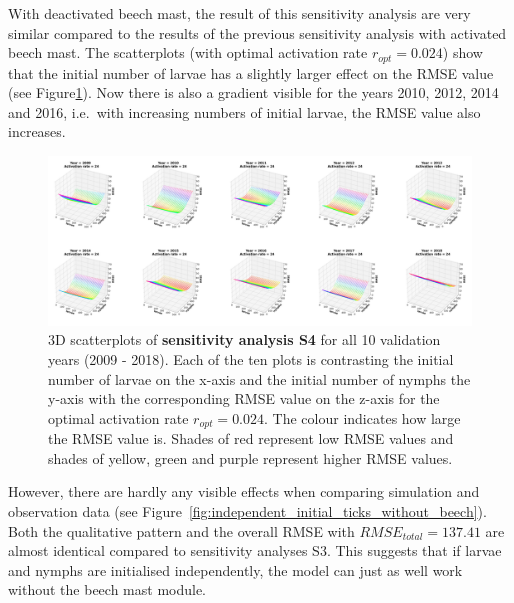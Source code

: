 \documentclass[a4paper, 11pt]{scrartcl}
\begin{document}
With deactivated beech mast, the result of this sensitivity analysis are very similar compared to the results of the previous sensitivity analysis with activated beech mast. The scatterplots (with optimal activation rate $r_{opt}= 0.024$) show that the initial number of larvae has a slightly larger effect on the RMSE value (see Figure\ref{fig:S4_2009_2018_rmse}). Now there is also a gradient visible for the years 2010, 2012, 2014 and 2016, i.e.\ with increasing numbers of initial larvae, the RMSE value also increases.

\begin{figure}[h!]
\centering
\includegraphics[width=\linewidth]{figures/S4_2009_2018_rmse}
\caption{3D scatterplots of \textbf{sensitivity analysis S4} for all 10 validation years (2009 - 2018). Each of the ten plots is contrasting the initial number of larvae on the x-axis and the initial number of nymphs the y-axis with the corresponding RMSE value on the z-axis for the optimal activation rate $r_{opt} = 0.024$. The colour indicates how large the RMSE value is. Shades of red represent low RMSE values and shades of yellow, green and purple represent higher RMSE values.}
\label{fig:S4_2009_2018_rmse}
\end{figure}

However, there are hardly any visible effects when comparing simulation and observation data (see Figure~\ref{fig:independent_initial_ticks_without_beech}). Both the qualitative pattern and the overall RMSE with $RMSE_{total} = 137.41$ are almost identical compared to sensitivity analyses S3. This suggests that if larvae and nymphs are initialised independently, the model can just as well work without the beech mast module.
\end{document}
